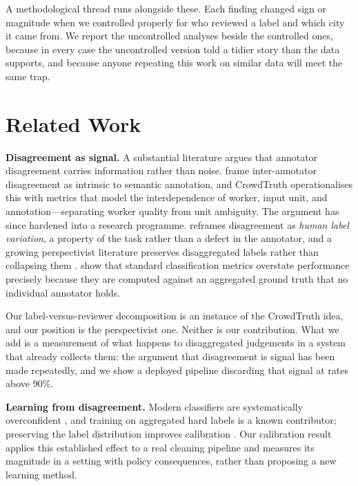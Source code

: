 \documentclass[sigconf]{acmart}
\begin{document}
A methodological thread runs alongside these. Each finding changed sign or
magnitude when we controlled properly for who reviewed a label and which city it
came from. We report the uncontrolled analyses beside the controlled ones,
because in every case the uncontrolled version told a tidier story than the data
supports, and because anyone repeating this work on similar data will meet the
same trap.

\section{Related Work}

\textbf{Disagreement as signal.} A substantial literature argues that annotator
disagreement carries information rather than noise. \citet{aroyo2015truth} frame
inter-annotator disagreement as intrinsic to semantic annotation, and CrowdTruth
\cite{dumitrache2018crowdtruth} operationalises this with metrics that model the
interdependence of worker, input unit, and annotation---separating worker
quality from unit ambiguity. The argument has since hardened into a research
programme. \citet{plank2022variation} reframes disagreement as \emph{human
label variation}, a property of the task rather than a defect in the annotator,
and a growing perspectivist literature preserves disaggregated labels rather
than collapsing them \cite{frenda2024perspectivist, davani2022disagreements}.
\citet{gordon2021deconvolution} show that standard classification metrics
overstate performance precisely because they are computed against an aggregated
ground truth that no individual annotator holds.

Our label-versus-reviewer decomposition is an instance of the CrowdTruth idea,
and our position is the perspectivist one. Neither is our contribution. What we
add is a measurement of what happens to disaggregated judgements in a system
that already collects them: the argument that disagreement is signal has been
made repeatedly, and we show a deployed pipeline discarding that signal at rates
above 90\%.

\textbf{Learning from disagreement.} Modern classifiers are systematically
overconfident \cite{guo2017calibration}, and training on aggregated hard labels
is a known contributor; preserving the label distribution improves calibration
\cite{peterson2019human, uma2021learning}. Our calibration result
applies this established effect to a real cleaning pipeline and measures its
magnitude in a setting with policy consequences, rather than proposing a new
learning method.
\end{document}
